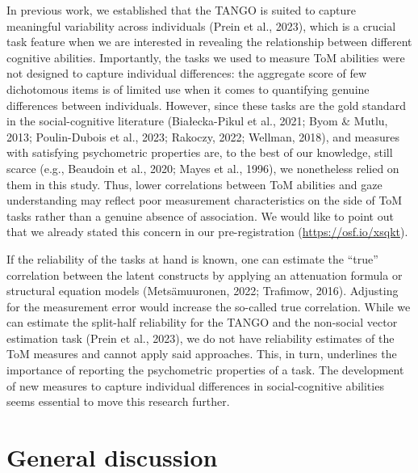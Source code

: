 \documentclass[
  man,mask,floatsintext]{apa7}
\begin{document}
In previous work, we established that the TANGO is suited to capture meaningful variability across individuals (Prein et al., 2023), which is a crucial task feature when we are interested in revealing the relationship between different cognitive abilities. Importantly, the tasks we used to measure ToM abilities were not designed to capture individual differences: the aggregate score of few dichotomous items is of limited use when it comes to quantifying genuine differences between individuals. However, since these tasks are the gold standard in the social-cognitive literature (Białecka-Pikul et al., 2021; Byom \& Mutlu, 2013; Poulin-Dubois et al., 2023; Rakoczy, 2022; Wellman, 2018), and measures with satisfying psychometric properties are, to the best of our knowledge, still scarce (e.g., Beaudoin et al., 2020; Mayes et al., 1996), we nonetheless relied on them in this study. Thus, lower correlations between ToM abilities and gaze understanding may reflect poor measurement characteristics on the side of ToM tasks rather than a genuine absence of association. We would like to point out that we already stated this concern in our pre-registration (\url{https://osf.io/xsqkt}).

If the reliability of the tasks at hand is known, one can estimate the ``true'' correlation between the latent constructs by applying an attenuation formula or structural equation models (Metsämuuronen, 2022; Trafimow, 2016). Adjusting for the measurement error would increase the so-called true correlation. While we can estimate the split-half reliability for the TANGO and the non-social vector estimation task (Prein et al., 2023), we do not have reliability estimates of the ToM measures and cannot apply said approaches. This, in turn, underlines the importance of reporting the psychometric properties of a task. The development of new measures to capture individual differences in social-cognitive abilities seems essential to move this research further.

\hypertarget{general-discussion}{%
\section{General discussion}\label{general-discussion}}
\end{document}
